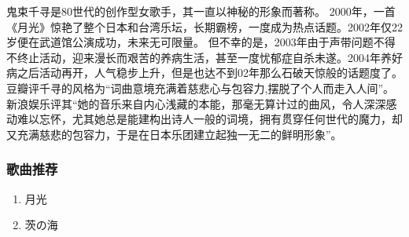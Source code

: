 \documentclass{ctexart}
\begin{document}
鬼束千寻是80世代的创作型女歌手，其一直以神秘的形象而著称。
2000年，一首《月光》惊艳了整个日本和台湾乐坛，长期霸榜，一度成为热点话题。2002年仅22岁便在武道馆公演成功，未来无可限量。
但不幸的是，2003年由于声带问题不得不终止活动，迎来漫长而艰苦的养病生活，甚至一度忧郁症自杀未遂。2004年养好病之后活动再开，人气稳步上升，但是也达不到02年那么石破天惊般的话题度了。
豆瓣评千寻的风格为“词曲意境充满着慈悲心与包容力,摆脱了个人而走入人间”。新浪娱乐评其“她的音乐来自内心浅藏的本能，那毫无算计过的曲风，令人深深感动难以忘怀，尤其她总是能建构出诗人一般的词境，拥有贯穿任何世代的魔力，却又充满慈悲的包容力，于是在日本乐团建立起独一无二的鲜明形象”。
\subsubsection*{歌曲推荐}
\begin{enumerate}
\item 月光
\item 茨の海
\end{enumerate}
\end{document}

